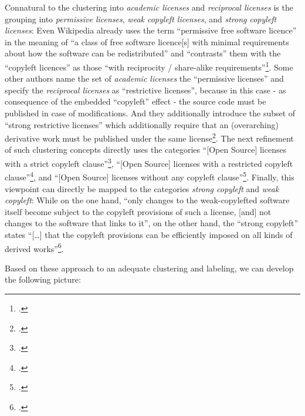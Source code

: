 Connatural to the clustering into \emph{academic licenses} and \emph{reciprocal
licenses} is the grouping into \emph{permissive licenses}, \emph{weak copyleft
licenses}, and \emph{strong copyleft licenses}: Even Wikipedia already uses the
term \enquote{permissive free software licence} in the meaning of \enquote{a
class of free software licence[s] with minimal requirements about how the
software can be redistributed} and \enquote{contrasts} them with the
\enquote{copyleft licences} as those \enquote{with reciprocity / share-alike
requirements}\footcite[cf.][\nopage wp]{wpPermLic2013a}. Some other authors name
the set of \emph{academic licenses} the \enquote{permissive licenses} and
specify the \emph{reciprocal licenses} as \enquote{restrictive licenses},
because in this case - as consequence of the embedded \enquote{copyleft} effect
- the source code must be published in case of modifications. And they
additionally introduce the subset of \enquote{strong restrictive licenses} which
additionally require that an (overarching) derivative work must be published
under the same license\footcite[pars pro toto cf.][57]{Buchtala2007a}. The next
refinement of such clustering concepts directly uses the categories
\enquote{[Open Source] licenses with a strict copyleft
clause}\footcite[Originally stated as \enquote{Lizenzen mit einer strengen
Copyleft-Klausel}. Cf.][24]{JaeMet2011a}, \enquote{[Open Source] licenses with a
restricted copyleft clause}\footcite[Originally stated as \enquote{Lizenzen mit
einer beschränkten Copyleft-Klausel}. Cf.][71]{JaeMet2011a}, and \enquote{[Open
Source] licenses without any copyleft clause}\footcite[Originally stated as
\enquote{Lizenzen ohne Copyleft-Klausel}. Cf.][83]{JaeMet2011a}. Finally, this
viewpoint can directly be mapped to the categories \emph{strong copyleft} and
\emph{weak copyleft}: While on the one hand, \enquote{only changes to the
weak-copylefted software itself become subject to the copyleft provisions of
such a license, [and] not changes to the software that links to it}, on the
other hand, the \enquote{strong copyleft} states \enquote{[\ldots] that the
copyleft provisions can be efficiently imposed on all kinds of derived
works}\footcite[cf.][\nopage wp]{wpCopyleft2013a}.

Based on these approach to an adequate clustering and labeling, we can develop
the following picture:

